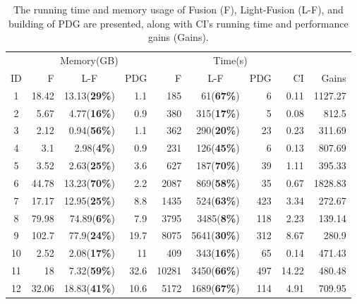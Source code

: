 \begin{table}[]\small
\caption{ 
The running time and memory usage of Fusion (F), Light-Fusion (L-F), and building of PDG are presented, along with CI's running time and performance gains (Gains).}
\label{table:compare}
\resizebox{\columnwidth}{!} {
\begin{tabular}{c|rrr|rrrr|r}
\hline
    & \multicolumn{3}{c|}{Memory(GB)} & \multicolumn{4}{c|}{Time(s)}                       &         \\
ID  & F         & \multicolumn{1}{c}{L-F}       & PDG     & F       & \multicolumn{1}{c}{L-F}     & PDG    & CI & Gains   \\ \hline
1   & 18.42     & 13.13(\textbf{29\%})     & 1.1     & 185     & 61(\textbf{67\%})      & 6      & 0.11                  & 1127.27 \\
2   & 5.67      & 4.77(\textbf{16\%})      & 0.9     & 380     & 315(\textbf{17\%})     & 5      & 0.08                  & 812.5   \\
3   & 2.12      & 0.94(\textbf{56\%})      & 1.1     & 362     & 290(\textbf{20\%})     & 23     & 0.23                  & 311.69  \\
4   & 3.1       & 2.98(\textbf{4\%})      & 0.9     & 231     & 126(\textbf{45\%})     & 6      & 0.13                  & 807.69  \\
5   & 3.52      & 2.63(\textbf{25\%})      & 3.6     & 627     & 187(\textbf{70\%})     & 39     & 1.11                  & 395.33  \\
6   & 44.78     & 13.23(\textbf{70\%})     & 2.2     & 2087    & 869(\textbf{58\%})     & 35     & 0.67                  & 1828.83 \\
7   & 17.17     & 12.95(\textbf{25\%})     & 8.8     & 1435    & 524(\textbf{63\%})     & 423    & 3.34                  & 272.67  \\
8   & 79.98     & 74.89(\textbf{6\%})     & 7.9     & 3795    & 3485(\textbf{8\%})    & 118    & 2.23                  & 139.14  \\
9   & 102.7     & 77.9(\textbf{24\%})      & 19.7    & 8075    & 5641(\textbf{30\%})    & 312    & 8.67                  & 280.9   \\
10  & 2.52      & 2.08(\textbf{17\%})      & 11      & 409     & 343(\textbf{16\%})     & 65     & 0.14                  & 471.43  \\
11  & 18        & 7.32(\textbf{59\%})      & 32.6    & 10281   & 3450(\textbf{66\%})    & 497    & 14.22                 & 480.48  \\
12  & 32.06     & 18.83(\textbf{41\%})     & 10.6    & 5172    & 1689(\textbf{67\%})    & 114    & 4.91                  & 709.95  \\

\end{tabular}}
\end{table}
